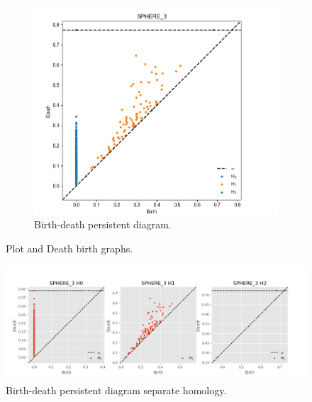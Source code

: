 \documentclass[11pt,a4paper]{report}
\begin{document}
\begin{figure}[H]
\begin{subfigure}[b]{0.45\linewidth}
                  \includegraphics[width=\linewidth]{./ripser/on_sphere_homology.PNG}
                  \caption{Birth-death persistent diagram.}
                \end{subfigure}
                \caption{Plot and Death birth graphs.}
                \label{fig: plot death}
              \end{figure}

              \begin{figure}[H]
                \centering
                \includegraphics[width=\linewidth]{./ripser/on_sphere_sep_homology.PNG}
                \caption{Birth-death persistent diagram separate homology.}
                \label{fig:sep hom}
              \end{figure}
\end{document}
